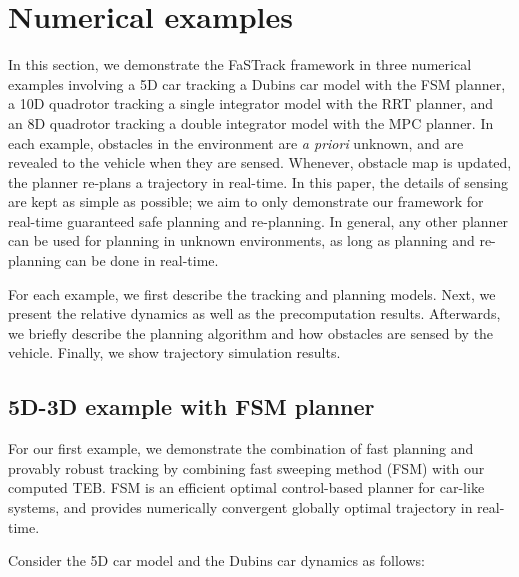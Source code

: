 \section{Numerical examples} \label{sec:results}

In this section, we demonstrate the FaSTrack framework in three numerical examples involving a 5D car tracking a Dubins car model with the FSM planner, a 10D quadrotor tracking a single integrator model with the RRT planner, and an 8D quadrotor tracking a double integrator model with the MPC planner.
In each example, obstacles in the environment are \textit{a priori} unknown, and are revealed to the vehicle when they are sensed.
Whenever, obstacle map is updated, the planner re-plans a trajectory in real-time.
In this paper, the details of sensing are kept as simple as possible; we aim to only demonstrate our framework for real-time guaranteed safe planning and re-planning.
In general, any other planner can be used for planning in unknown environments, as long as planning and re-planning can be done in real-time.

For each example, we first describe the tracking and planning models. 
Next, we present the relative dynamics as well as the precomputation results. 
Afterwards, we briefly describe the planning algorithm and how obstacles are sensed by the vehicle. 
Finally, we show trajectory simulation results.

\subsection{5D-3D example with FSM planner \label{sec:reach_planner}}

For our first example, we demonstrate the combination of fast planning and provably robust tracking by combining fast sweeping method (FSM) \cite{Takei2013} with our computed TEB. 
FSM is an efficient optimal control-based planner for car-like systems, and provides numerically convergent globally optimal trajectory in real-time.

Consider the 5D car model and the Dubins car dynamics as follows:

